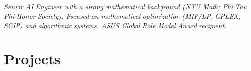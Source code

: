 



\begin{center}

    \small \textit{Senior AI Engineer with a strong mathematical background (NTU Math; Phi Tau Phi Honor Society). Focused on mathematical optimization (MIP/LP, CPLEX, SCIP) and algorithmic systems. ASUS Global Role Model Award recipient.}
\end{center}


\resumeItemListStart




\resumeItemListEnd
\resumeSubHeadingListEnd



\section{Projects}
    \resumeSubHeadingListStart


    \resumeSubHeadingListEnd





